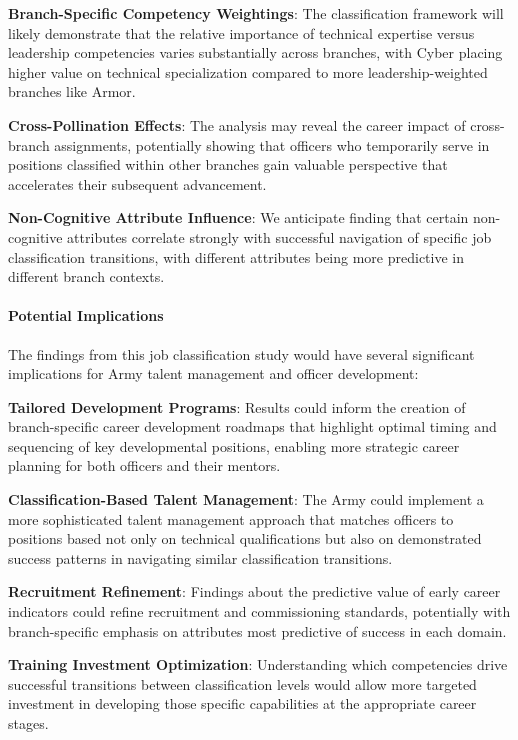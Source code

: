 \documentclass[./main.tex]{subfiles}
\begin{document}
\textbf{Branch-Specific Competency Weightings}: The classification
framework will likely demonstrate that the relative importance of
technical expertise versus leadership competencies varies substantially
across branches, with Cyber placing higher value on technical
specialization compared to more leadership-weighted branches like Armor.

\textbf{Cross-Pollination Effects}: The analysis may reveal the career
impact of cross-branch assignments, potentially showing that officers
who temporarily serve in positions classified within other branches gain
valuable perspective that accelerates their subsequent advancement.

\textbf{Non-Cognitive Attribute Influence}: We anticipate finding that
certain non-cognitive attributes correlate strongly with successful
navigation of specific job classification transitions, with different
attributes being more predictive in different branch contexts.

\paragraph{Potential Implications}\label{potential-implications}

The findings from this job classification study would have several
significant implications for Army talent management and officer
development:

\textbf{Tailored Development Programs}: Results could inform the
creation of branch-specific career development roadmaps that highlight
optimal timing and sequencing of key developmental positions, enabling
more strategic career planning for both officers and their mentors.

\textbf{Classification-Based Talent Management}: The Army could
implement a more sophisticated talent management approach that matches
officers to positions based not only on technical qualifications but
also on demonstrated success patterns in navigating similar
classification transitions.

\textbf{Recruitment Refinement}: Findings about the predictive value of
early career indicators could refine recruitment and commissioning
standards, potentially with branch-specific emphasis on attributes most
predictive of success in each domain.

\textbf{Training Investment Optimization}: Understanding which
competencies drive successful transitions between classification levels
would allow more targeted investment in developing those specific
capabilities at the appropriate career stages.
\end{document}
